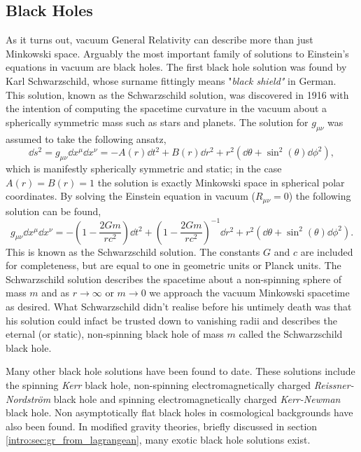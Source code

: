 \subsection{Black Holes}\label{intro:sec:bh_theory}
 As it turns out, vacuum General Relativity can describe more than just Minkowski space. Arguably the most important family of solutions to Einstein's equations in vacuum are black holes. The first black hole solution was found by Karl Schwarzschild, whose surname fittingly means {"\it black shield"} in German. This solution, known as the Schwarzschild solution, was discovered in 1916 with the intention of computing the spacetime curvature in the vacuum about a spherically symmetric mass such as stars and planets. The solution for $g_{\mu\nu}$ was assumed to take the following ansatz,
 \begin{equation} \label{intro:eq:sc_ansatz}
\dd s^2 = g_{\mu\nu} \dd x^\mu \dd x^\nu= -A(r) \dd t^2 + B(r) \dd r^2 + r^2 \left(\dd \theta + \sin^2(\theta) \dd \phi^2\right),
 \end{equation}
which is manifestly spherically symmetric and static; in the case $A(r)=B(r)=1$ the solution is exactly Minkowski space in spherical polar coordinates. By solving the Einstein equation in vacuum ($R_{\mu\nu} = 0$) the following solution can be found,
 \begin{equation}
 g_{\mu\nu} \dd x^\mu \dd x^\nu= -\left(1-\frac{2Gm}{rc^2}\right) \dd t^2 + \left(1-\frac{2Gm}{rc^2}\right)^{-1} \dd r^2 + r^2 \left(\dd \theta + \sin^2(\theta) \dd \phi^2\right).
 \end{equation}
This is known as the Schwarzschild solution. The constants $G$ and $c$ are included for completeness, but are equal to one in geometric units or Planck units. The Schwarzschild solution describes the spacetime about a non-spinning sphere of mass $m$ and as $r\rightarrow \infty$ or $m\rightarrow 0$ we approach the vacuum Minkowski spacetime as desired. What Schwarzschild didn't realise before his untimely death was that his solution could infact be trusted down to vanishing radii and describes the eternal (or static), non-spinning black hole of mass $m$ called the Schwarzschild black hole.

Many other black hole solutions have been found to date. These solutions include the spinning {\it Kerr} black hole, non-spinning electromagnetically charged {\it Reissner-Nordström} black hole and spinning electromagnetically charged {\it Kerr-Newman} black hole. Non asymptotically flat black holes in cosmological backgrounds have also been found. In modified gravity theories, briefly discussed in section \ref{intro:sec:gr_from_lagrangean}, many exotic black hole solutions exist.


